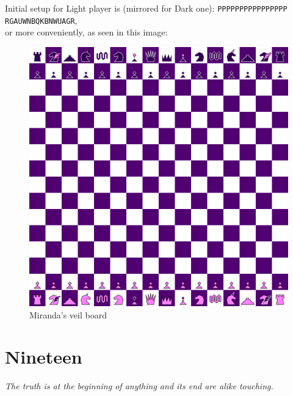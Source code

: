 \documentclass[a5paper,12pt,draft]{book} %
\begin{document}
Initial setup for Light player is (mirrored for Dark one):
\texttt{PPPPPPPPPPPPPPPP \\
        RGAUWNBQKBNWUAGR}, \\
or more conveniently, as seen in this image:

\noindent
\begin{figure}[h]
\includegraphics[width=1.0\textwidth, keepaspectratio=true]{../gfx/boards/10_miranda_s_veil.png}
\caption{Miranda's veil board}
\label{fig:miranda_s_veil}
\end{figure}

\clearpage

\chapter*{Nineteen}

\begin{flushright}
\parbox{0.8\textwidth}{
\emph{The truth is at the beginning of anything and its end are alike touching. \\
 } }
\end{flushright}
\end{document}

